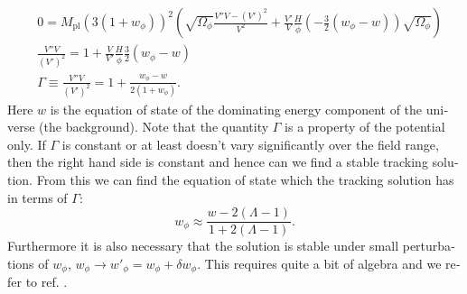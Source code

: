 \documentclass[master,       %
               twoside,        %
               BCOR10mm,       %
               english,ngerman, %
               ]{GAUBM}
\begin{document}
\begin{otherlanguage}{english}
\begin{align}
	&0 = M_\mathrm{pl}  (3(1 + w_\phi))^2 \left( \sqrt{\Omega_\phi} \frac{V'' V - (V')^2}{V^2} + \frac{V'}{V} \frac{H}{\dot{\phi}} \left( - \frac{3}{2} (w_\phi - w) \right) \sqrt{\Omega_\phi} \right) \nonumber \\
	&\frac{V'' V}{(V')^2} = 1 + \frac{V}{V'} \frac{H}{\dot{\phi}} \frac{3}{2} (w_\phi - w) \nonumber \\
	& \Gamma \equiv \frac{V'' V}{(V')^2} = 1 + \frac{w_\phi - w}{2(1 + w_\phi)}.
	\label{eq:tracking_condition}
\end{align}
Here $w$ is the equation of state of the dominating energy component of the universe (the background).
Note that the quantity $\Gamma$ is a property of the potential only.
If $\Gamma$ is constant or at least doesn't vary significantly over the field range, then the right hand side is constant and hence can we find a stable tracking solution.
From this we can find the equation of state which the tracking solution has in terms of $\Gamma$:
\begin{equation}
	\label{eq:tracking_equation_of_state}
	w_\phi \approx \frac{w - 2(\Lambda - 1)}{1 + 2(\Lambda - 1)}.
\end{equation}
Furthermore it is also necessary that the solution is stable under small perturbations of $w_\phi$, $w_\phi \to w'_\phi = w_\phi + \delta w_\phi$. This requires quite a bit of algebra and we refer to ref. \cite{tracking_solutions_Steinhardt:1999nw}.


\end{otherlanguage}
\end{document}
